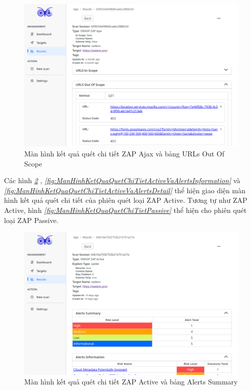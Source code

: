 \begin{figure}[H]
      \centering
      \includegraphics[width=\textwidth]{applied-thesis-chapters/chapter-6/Màn hình kết quả quét chi tiết ZAP Ajax và bảng URLs Out Of Scope.png}
      \caption{Màn hình kết quả quét chi tiết ZAP Ajax và bảng URLs Out Of Scope}
      \label{fig:ManHinhKetQuaQuetChiTietAjaxVaURLsOutOfScope}
\end{figure}

Các hình \textit{\ref{fig:ManHinhKetQuaQuetChiTietActiveVaAlertsSummary} }
, \textit{\ref{fig:ManHinhKetQuaQuetChiTietActiveVaAlertsInformation} } 
và \textit{\ref{fig:ManHinhKetQuaQuetChiTietActiveVaAlertsDetail} } 
thể hiện giao diện màn hình kết quả quét chi tiết của phiên quét loại ZAP Active.
Tương tự như ZAP Active, hình \textit{\ref{fig:ManHinhKetQuaQuetChiTietPassive} } 
thể hiện cho phiên quét loại ZAP Passive.

\begin{figure}[H]
      \centering
      \includegraphics[width=\textwidth]{applied-thesis-chapters/chapter-6/Màn hình kết quả quét chi tiết ZAP Active và bảng Alerts Summary.png}
      \caption{Màn hình kết quả quét chi tiết ZAP Active và bảng Alerts Summary}
      \label{fig:ManHinhKetQuaQuetChiTietActiveVaAlertsSummary}
\end{figure}

